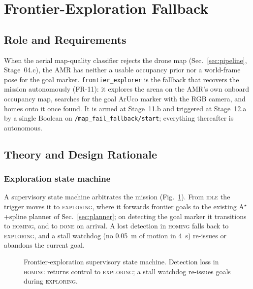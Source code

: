 \documentclass[conference]{IEEEtran}
\newcommand{\subsys}[1]{\texttt{#1}}      %
\begin{document}
\section{Frontier-Exploration Fallback}
\label{sec:frontier}

\subsection{Role and Requirements}
When the aerial map-quality classifier rejects the drone map
(Sec.~\ref{sec:pipeline}, Stage~04.c), the AMR has neither a usable occupancy
prior nor a world-frame pose for the goal marker. \subsys{frontier\_explorer} is
the fallback that recovers the mission autonomously (FR-11): it explores the
arena on the AMR's own onboard occupancy map, searches for the goal ArUco marker
with the RGB camera, and homes onto it once found. It is armed at Stage~11.b and
triggered at Stage~12.a by a single Boolean on
\texttt{/map\_fail\_fallback/start}; everything thereafter is autonomous.

\subsection{Theory and Design Rationale}
\subsubsection{Exploration state machine}
A supervisory state machine arbitrates the mission
(Fig.~\ref{fig:frontier-fsm}). From \textsc{idle} the trigger moves it to
\textsc{exploring}, where it forwards frontier goals to the existing
A$^\star$+spline planner of Sec.~\ref{sec:planner}; on detecting the goal marker
it transitions to \textsc{homing}, and to \textsc{done} on arrival. A lost
detection in \textsc{homing} falls back to \textsc{exploring}, and a stall
watchdog (no \SI{0.05}{\meter} of motion in \SI{4}{\second}) re-issues or
abandons the current goal.

\begin{figure}[t]
\centering
{}
\caption{Frontier-exploration supervisory state machine. Detection loss in
\textsc{homing} returns control to \textsc{exploring}; a stall watchdog re-issues
goals during \textsc{exploring}.}
\label{fig:frontier-fsm}
\end{figure}
\end{document}
